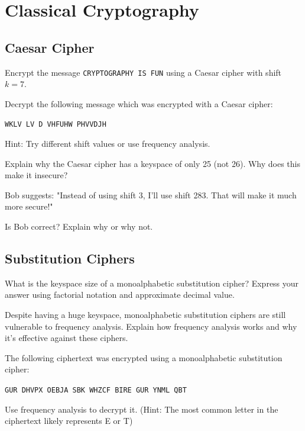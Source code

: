 \documentclass[11pt,a4paper]{report}
\begin{document}
\section{Classical Cryptography}

\subsection{Caesar Cipher}

\begin{ex}
Encrypt the message \texttt{CRYPTOGRAPHY IS FUN} using a Caesar cipher with shift $k = 7$.
\end{ex}

\begin{ex}
Decrypt the following message which was encrypted with a Caesar cipher:

\texttt{WKLV LV D VHFUHW PHVVDJH}

Hint: Try different shift values or use frequency analysis.
\end{ex}

\begin{ex}
Explain why the Caesar cipher has a keyspace of only 25 (not 26). Why does this make it insecure?
\end{ex}

\begin{ex}
Bob suggests: "Instead of using shift 3, I'll use shift 283. That will make it much more secure!"

Is Bob correct? Explain why or why not.
\end{ex}

\subsection{Substitution Ciphers}

\begin{ex}
What is the keyspace size of a monoalphabetic substitution cipher? Express your answer using factorial notation and approximate decimal value.
\end{ex}

\begin{ex}
Despite having a huge keyspace, monoalphabetic substitution ciphers are still vulnerable to frequency analysis. Explain how frequency analysis works and why it's effective against these ciphers.
\end{ex}

\begin{ex}
The following ciphertext was encrypted using a monoalphabetic substitution cipher:

\texttt{GUR DHVPX OEBJA SBK WHZCF BIRE GUR YNML QBT}

Use frequency analysis to decrypt it. (Hint: The most common letter in the ciphertext likely represents E or T)
\end{ex}
\end{document}
